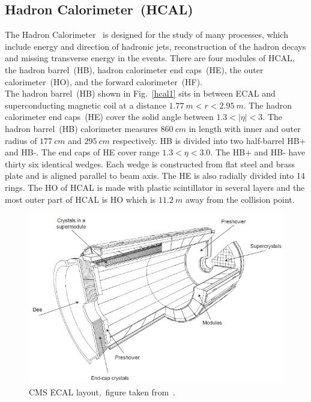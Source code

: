 \subsection{Hadron Calorimeter~(HCAL)}
The Hadron Calorimeter~\cite{collaboration_2011} is designed for the study of many processes, which include energy and direction of hadronic jets, reconstruction of the hadron decays and missing transverse energy in the events. There are four modules of HCAL, the hadron barrel~(HB), hadron calorimeter end caps~(HE), the outer calorimeter~(HO), and the forward calorimeter~(HF).\\
The hadron barrel~(HB) shown in Fig.~\ref{hcal1} sits in between ECAL and superconducting magnetic coil at a distance $1.77~m < r < 2.95~m$. The hadron calorimeter end caps~(HE) cover the solid angle between $ 1.3 < |\eta| < 3$. The hadron barrel~(HB) calorimeter measures $860~cm$ in length with inner and outer radius of $177~cm$ and $295~cm$ respectively. HB is divided into two half-barrel HB+ and HB-. The end caps of HE cover range $1.3 < \eta < 3.0$. The HB+ and HB- have thirty six identical wedges. Each wedge is constructed from flat steel and brass plate and is aligned parallel to beam axis. The HE is also radially divided into 14 rings. The HO of HCAL is made with plastic scintillator in several layers and the most outer part of HCAL is HO which is $11.2~m$ away from the  collision point. 
\begin{figure}[H]
\centering
\includegraphics[scale=0.5]{chapter2/Ecal1.png}
\caption{CMS ECAL layout,~figure taken from~\cite{Collaboration_2008cms}.}
\label{ecal1}
\end{figure}
